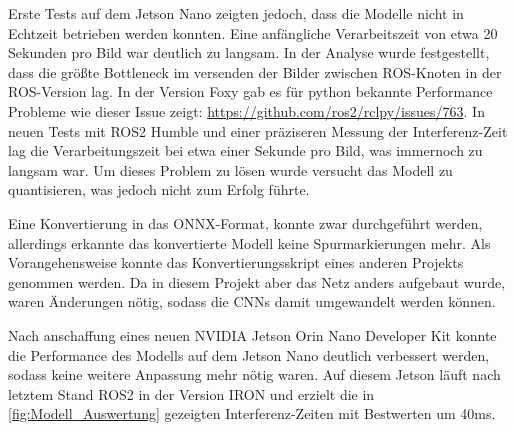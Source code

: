 \documentclass{article}
\begin{document}
            
            Erste Tests auf dem Jetson Nano zeigten jedoch, dass die Modelle nicht in Echtzeit betrieben werden konnten. Eine anfängliche Verarbeitszeit von etwa 20 Sekunden pro Bild war deutlich zu langsam.
            In der Analyse wurde festgestellt, dass die größte Bottleneck im versenden der Bilder zwischen ROS-Knoten in der ROS-Version lag. In der Version Foxy gab es für python bekannte Performance Probleme wie dieser Issue zeigt: \url{https://github.com/ros2/rclpy/issues/763}.
            In neuen Tests mit ROS2 Humble und einer präziseren Messung der Interferenz-Zeit lag die Verarbeitungszeit bei etwa einer Sekunde pro Bild, was immernoch zu langsam war.
            Um dieses Problem zu lösen wurde versucht das Modell zu quantisieren, was jedoch nicht zum Erfolg führte.
            
            Eine Konvertierung in das ONNX-Format, konnte zwar durchgeführt werden, allerdings erkannte das konvertierte Modell keine Spurmarkierungen mehr.
            Als Vorangehensweise konnte das Konvertierungsskript eines anderen Projekts genommen werden. Da in diesem Projekt aber das Netz anders aufgebaut wurde, waren Änderungen nötig, sodass die CNNs damit umgewandelt werden können. 

            Nach anschaffung eines neuen NVIDIA Jetson Orin Nano Developer Kit konnte die Performance des Modells auf dem Jetson Nano deutlich verbessert werden, sodass keine weitere Anpassung mehr nötig waren.
            Auf diesem Jetson läuft nach letztem Stand ROS2 in der Version IRON und erzielt die in \ref{fig:Modell_Auswertung} gezeigten Interferenz-Zeiten mit Bestwerten um 40ms.
\end{document}
